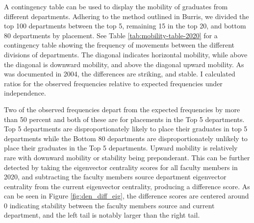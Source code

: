 \documentclass{article}
\begin{document}
A contingency table can be used to display the mobility of graduates from different departments. Adhering to the method outlined in Burris, we divided the top 100 departments between the top 5, remaining 15 in the top 20, and bottom 80 departments by placement. See Table \ref{tab:mobility-table-2020} for a contingency table showing the frequency of movements between the different divisions of departments. The diagonal indicates horizontal mobility, while above the diagonal is downward mobility, and above the diagonal upward mobility. As was documented in 2004, the differences are striking, and stable. I calculated ratios for the observed frequencies relative to expected frequencies under independence.

Two of the observed frequencies depart from the expected frequencies by more than 50 percent and both of these are for placements in the Top 5 departments. Top 5 departments are disproportionately likely to place their graduates in top 5 departments while the Bottom 80 departments are disproportionately unlikely to place their graduates in the Top 5 departments. Upward mobility is relatively rare with downward mobility or stability being preponderant. This can be further detected by taking the eigenvector centrality scores for all faculty members in 2020, and subtracting the faculty members source department eigenvector centrality from the current eigenvector centrality, producing a difference score. As can be seen in Figure \ref{fig:den_diff_eig}, the difference scores are centered around 0 indicating stability between the faculty members source and current department, and the left tail is notably larger than the right tail.
\end{document}

